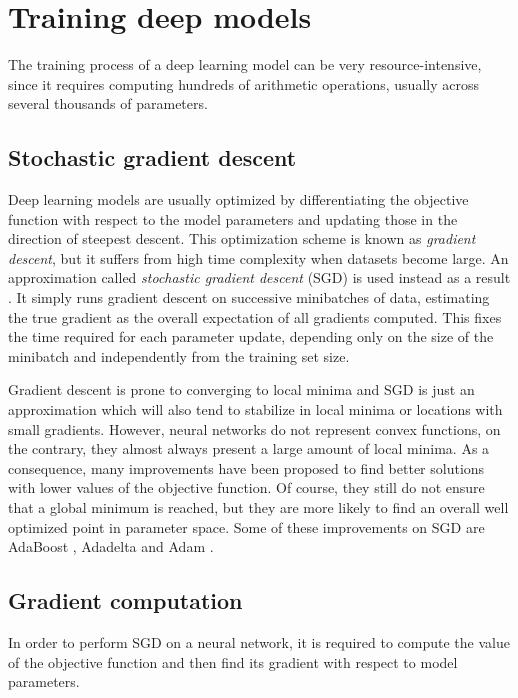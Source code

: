 \section{Training deep models}

The training process of a deep learning model can be very resource-intensive, since it requires computing hundreds of arithmetic operations, usually across several thousands of parameters. 

\subsection{Stochastic gradient descent}

Deep learning models are usually optimized by differentiating the objective function with respect to the model parameters and updating those in the direction of steepest descent. This optimization scheme is known as \textit{gradient descent}, but it suffers from high time complexity when datasets become large. An approximation called \textit{stochastic gradient descent} (SGD) is used instead as a result . It simply runs gradient descent on successive minibatches of data, estimating the true gradient as the overall expectation of all gradients computed. This fixes the time required for each parameter update, depending only on the size of the minibatch and independently from the training set size.

Gradient descent is prone to converging to local minima and SGD is just an approximation which will also tend to stabilize in local minima or locations with small gradients. However, neural networks do not represent convex functions, on the contrary, they almost always present a large amount of local minima. As a consequence, many improvements have been proposed to find better solutions with lower values of the objective function. Of course, they still do not ensure that a global minimum is reached, but they are more likely to find an overall well optimized point in parameter space. Some of these improvements on SGD are AdaBoost , Adadelta  and Adam .

\subsection{Gradient computation}

In order to perform SGD on a neural network, it is required to compute the value of the objective function and then find its gradient with respect to model parameters. 


